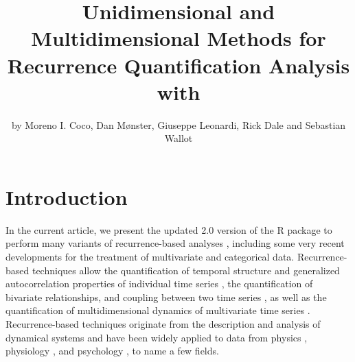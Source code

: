 
\title{Unidimensional and Multidimensional Methods for Recurrence Quantification Analysis with }

\author{by Moreno I. Coco, Dan M{\o}nster, Giuseppe Leonardi,
Rick Dale and Sebastian Wallot}

\maketitle


\section{Introduction}

In the current article, we present the updated 2.0 version of the R package  to perform many variants of recurrence-based analyses \citep{coco2014cross}, including some very recent developments for the treatment of multivariate and categorical data. Recurrence-based techniques allow the quantification of temporal structure and generalized autocorrelation properties of individual time series \citep{webber1994dynamical, zbilut1992embeddings}, the quantification of bivariate relationships, and coupling between two time series \citep{zbilut1998detecting, marwan2002nonlinear}, as well as the quantification of multidimensional dynamics of multivariate time series \citep{wallot2016multidimensional, wallot2018calculation}. Recurrence-based techniques originate from the description and analysis of dynamical systems \citep{marwan2007recurrence, marwan2002nonlinear} and have been widely applied to data from physics \citep{alex2015order, ambrozkiewicz2019dynamical, donner2007scale, hilarov2017detection, zolotova2006phase}, physiology \citep{Marwan2002heart, langbein2004visual, thomasson2001recurrence, mestivier2001effects, monster2016physiological, timothy2017classification}, and psychology \citep{abney2014using, coco2018performance, coco2016multilevel, shockley2003mutual,wallot2019switching, wijnants2012interaction, pagnotta2020attentional}, to name a few fields.

